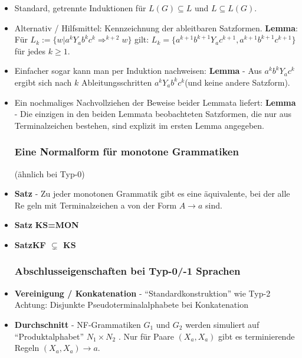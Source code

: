 \documentclass[12pt, a4paper]{article}
\begin{document}
\begin{itemize}
		\item Standard, getrennte Induktionen für $L(G)\subseteq L$ und $L\subseteq L(G)$.
		
		\item Alternativ / Hilfsmittel: Kennzeichnung der ableitbaren Satzformen.
			\subitem\textbf{Lemma}: Für $L_{k}:= \{w |a^{k}Y_{a}b^{k}c^{k}\Rightarrow^{k+2} w\}$ gilt: $L_{k}= \{a^{k+1}b^{k+1}Y_{a}c^{k+1}, a^{k+1}b^{k+1}c^{k+1}\}$ für jedes $k\geq 1$.
			
		\item Einfacher sogar kann man per Induktion nachweisen:
			\subitem \textbf{Lemma} - Aus $a^{k}b^{k}Y_{a}c^{k}$ ergibt sich nach $k$ Ableitungsschritten $a^{k}Y_{a}b^{k}c^{k}$(und keine andere Satzform).
		
		\item Ein nochmaliges Nachvollziehen der Beweise beider Lemmata liefert:
			\subitem \textbf{Lemma} - Die einzigen in den beiden Lemmata beobachteten Satzformen, die nur
		aus Terminalzeichen bestehen, sind explizit im ersten Lemma angegeben.
		
		\subsubsection{Eine Normalform für monotone Grammatiken} (ähnlich bei Typ-0)
			\item \textbf{Satz} - Zu jeder monotonen Grammatik gibt es eine äquivalente, bei der alle Re
			geln mit Terminalzeichen a von der Form $A\rightarrow a$ sind.
			
			\item \textbf{Satz} \textbf{KS=MON}
			
			\item \textbf{Satz}\textbf{KF $\subsetneq$ KS}

		\subsubsection{Abschlusseigenschaften bei Typ-0/-1 Sprachen}
		
		\item \textbf{Vereinigung / Konkatenation} - “Standardkonstruktion” wie Typ-2
			\subitem Achtung: Disjunkte Pseudoterminalalphabete bei Konkatenation
		
		\item \textbf{Durchschnitt} - NF-Grammatiken $G_{1}$ und $G_{2}$ werden simuliert auf “Produktalphabet” $N_{1}\times N_{2}$ . Nur für Paare $(X_{a},X_{a})$ gibt es terminierende Regeln $(X_{a},X_{a})\rightarrow a$.
		

\end{itemize}
\end{document}
